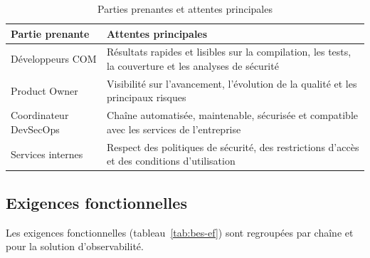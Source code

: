 \begin{table}[H]
\centering
\caption{Parties prenantes et attentes principales}
\label{tab:parties-prenantes}
\small
\begin{tabularx}{\textwidth}{@{}p{3.4cm} X@{}}
\toprule
\textbf{Partie prenante} & \textbf{Attentes principales} \\
\midrule
Développeurs COM & Résultats rapides et lisibles sur la compilation, les tests,
  la couverture et les analyses de sécurité \\
Product Owner & Visibilité sur l'avancement, l'évolution de la qualité et les
  principaux risques \\
Coordinateur DevSecOps & Chaîne automatisée, maintenable, sécurisée et
  compatible avec les services de l'entreprise \\
Services internes & Respect des politiques de sécurité, des restrictions d'accès
  et des conditions d'utilisation \\
\bottomrule
\end{tabularx}
\end{table}

\subsection{Exigences fonctionnelles}

Les exigences fonctionnelles (tableau~\ref{tab:bes-ef}) sont regroupées par
chaîne et pour la solution d'observabilité.

